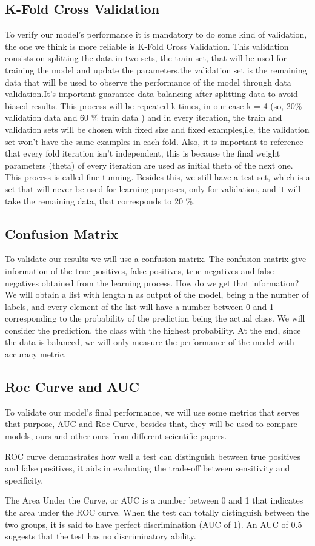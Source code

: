 \documentclass[12pt,a4paper,twocolumn]{article}
\begin{document}
\subsection{K-Fold Cross Validation}
\par To verify our model's performance it is mandatory to do some kind of validation, the one we think is more reliable is K-Fold Cross Validation. This validation consists on splitting the data in two sets, the train set, that will be used for training the model and update the parameters,the validation set is the remaining data that will be used to observe the performance of the model through data validation.It's important guarantee  data balancing after splitting data  to avoid biased results. 
This process will be repeated k times, in our case k = 4 (so, 20\% validation data and 60 \% train data ) and in every iteration, the train and validation sets will be chosen  with fixed size and fixed examples,i.e, the validation set won't have the same examples in each fold. Also, it is important to reference that every fold iteration isn't independent, this is because the final weight parameters (theta) of every iteration are used as initial theta of the next one. This process is called fine tunning.
Besides this, we still have a test set, which is a set that will never be used for learning purposes, only for validation, and it will take the remaining data, that corresponds to 20 \%.

\subsection{Confusion Matrix}
\par To validate our results we will use a confusion matrix. The confusion matrix give information of the true positives, false positives, true negatives and false negatives  obtained from the learning process. How do we get that information? We will obtain a list with length n as output of the model, being n the number of labels, and every element of the list will have a number between 0 and 1 corresponding to the probability of the prediction being the actual class. We will consider the prediction, the class with the highest probability.
At the end, since the data is balanced, we will only measure the performance of the model with accuracy metric.
\subsection{Roc Curve and AUC}
\par To validate our model's final performance, we will use some metrics that serves that purpose, AUC and Roc Curve, besides that, they will be used to compare models, ours and other ones from different scientific papers.
\par ROC curve demonstrates how well a test can distinguish between true positives and false positives, it aids in evaluating the trade-off between sensitivity and specificity.
\par The Area Under the Curve, or AUC is a number between 0 and 1 that indicates the area under the ROC curve. When the test can totally distinguish between the two groups, it is said to have perfect discrimination (AUC of 1). An AUC of 0.5 suggests that the test has no discriminatory ability.
\end{document}
